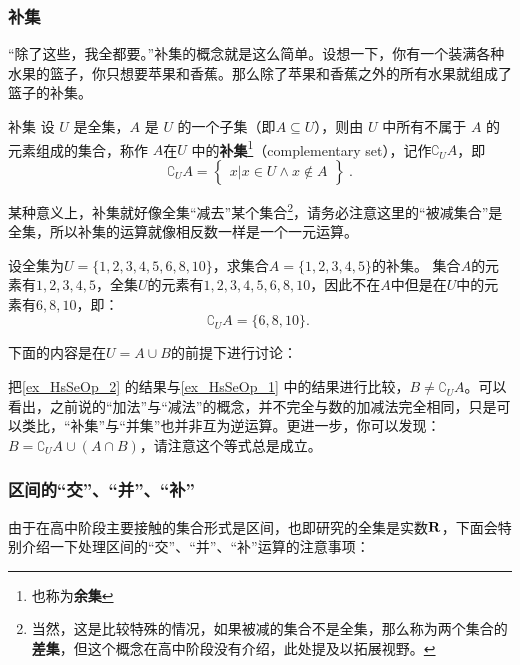\subsubsection{补集}

“除了这些，我全都要。”补集的概念就是这么简单。设想一下，你有一个装满各种水果的篮子，你只想要苹果和香蕉。那么除了苹果和香蕉之外的所有水果就组成了篮子的补集。

\begin{definition}{补集}\label{def_HsSeOp_1}
设 $U$ 是全集，$A$ 是 $U$ 的一个子集（即$A\subseteq U$），则由 $U$ 中所有不属于 $A$ 的元素组成的集合，称作 $A$在$U$ 中的\textbf{补集}\footnote{也称为\textbf{余集}}（complementary set），记作$\complement_UA$，即
\begin{equation}
\complement_UA = \begin{Bmatrix}x|x\in U \wedge x\notin A\end{Bmatrix}~.
\end{equation}
\end{definition}


某种意义上，补集就好像全集“减去”某个集合\footnote{当然，这是比较特殊的情况，如果被减的集合不是全集，那么称为两个集合的\textbf{差集}，但这个概念在高中阶段没有介绍，此处提及以拓展视野。}，请务必注意这里的“被减集合”是全集，所以补集的运算就像相反数一样是一个一元运算。

\begin{example}{设全集为$U=\{1,2,3,4,5,6,8,10\}$，求集合$A=\{1,2,3,4,5\}$的补集。}\label{ex_HsSeOp_2}
集合$A$的元素有$1,2,3,4,5$，全集$U$的元素有$1,2,3,4,5,6,8,10$，因此不在$A$中但是在$U$中的元素有$6,8,10$，即：
$$
\complement_UA=\{6,8,10\}.~
$$
\end{example}

下面的内容是在$U=A\cup B$的前提下进行讨论：

把\autoref{ex_HsSeOp_2} 的结果与\autoref{ex_HsSeOp_1} 中的结果进行比较，$B\neq\complement_UA$。可以看出，之前说的“加法”与“减法”的概念，并不完全与数的加减法完全相同，只是可以类比，“补集”与“并集”也并非互为逆运算。更进一步，你可以发现：$\displaystyle B=\complement_{U}A\cup(A\cap B)$，请注意这个等式总是成立。

\subsubsection{区间的“交”、“并”、“补”}

由于在高中阶段主要接触的集合形式是区间，也即研究的全集是实数${\bf R}$，下面会特别介绍一下处理区间的“交”、“并”、“补”运算的注意事项：

